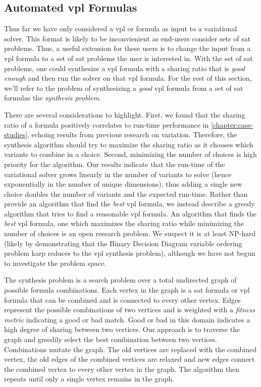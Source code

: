 \subsection{Automated \ac{vpl} Formulas}
Thus far we have only considered a \ac{vpl} or \evpl{} formula as input to a
variational solver. This format is likely to be inconvienient as end-users
consider sets of \ac{sat} problems. Thus, a useful extension for these users is
to change the input from a \ac{vpl} formula to a set of \ac{sat} problems the
user is interested in. With the set of \ac{sat} problems, one could synthesize a
\ac{vpl} formula with a sharing ratio that is \emph{good enough} and then run
the solver on that \ac{vpl} formula. For the rest of this section, we'll refer
to the problem of synthesizing a \emph{good} \ac{vpl} formula from a set of
\ac{sat} formulas the \emph{synthesis problem}.

There are several considerations to highlight. First, we found that the sharing
ratio of a formula positively correlates to run-time performance in
\autoref{chapter:case-studies}, echoing results from previous research on
variation. Therefore, the synthesis algorithm should try to maximize the sharing
ratio as it chooses which variants to combine in a choice. Second, minimizing
the number of choices is high priority for the algorithm. Our results indicate
that the run-time of the variational solver grows linearly in the number of
variants to solve (hence exponentially in the number of unique dimensions), thus
adding a single new choice doubles the number of variants and the expected
run-time. Rather than provide an algorithm that find the \emph{best} \ac{vpl}
formula, we instead describe a greedy algorithm that tries to find a reasonable
\ac{vpl} formula. An algorithm that finds the \emph{best} \ac{vpl} formula,
\eg{} one which maximizes the sharing ratio while minimizing the number of
choices is an open research problem. We suspect it is at least NP-hard (likely
by demonstrating that the Binary Decision Diagram variable ordering problem karp
reduces to the \ac{vpl} synthesis problem), although we have not begun to
investigate the problem space.

The synthesis problem is a search problem over a total undirected graph of
possible formula combinations. Each vertex in the graph is a \ac{sat} formula or
\ac{vpl} formula that can be combined and is connected to every other vertex.
Edges represent the possible combinations of two vertices and is weighted with a
\emph{fitness metric} indicating a good or bad match. Good or bad in this domain
indicates a high degree of sharing between two vertices. Our approach is to
traverse the graph and greedily select the best combination between two
vertices. Combinations mutate the graph. The old vertices are replaced with the
combined vertex, the old edges of the combined vertices are relaxed and new
edges connect the combined vertex to every other vertex in the graph. The
algorithm then repeats until only a single vertex remains in the graph.

